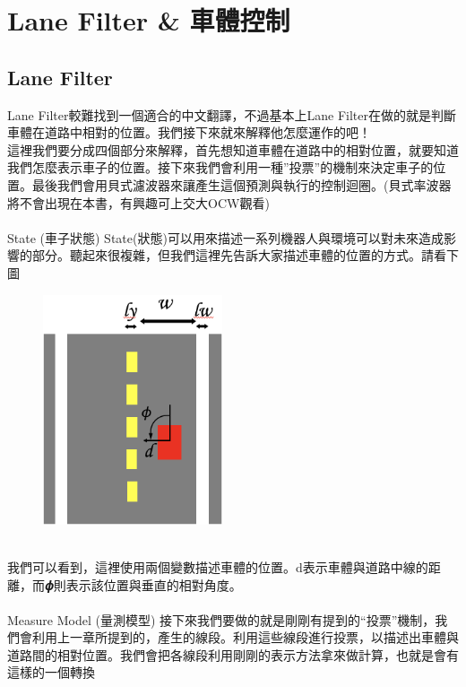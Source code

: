 \documentclass{article}
\begin{document}
\newpage
\section{Lane Filter \& 車體控制}
\subsection{Lane Filter}
Lane Filter較難找到一個適合的中文翻譯，不過基本上Lane Filter在做的就是判斷車體在道路中相對的位置。我們接下來就來解釋他怎麼運作的吧！
\\這裡我們要分成四個部分來解釋，首先想知道車體在道路中的相對位置，就要知道我們怎麼表示車子的位置。接下來我們會利用一種”投票”的機制來決定車子的位置。最後我們會用貝式濾波器來讓產生這個預測與執行的控制迴圈。(貝式率波器將不會出現在本書，有興趣可上交大OCW觀看)
\\\\State (車子狀態)
State(狀態)可以用來描述一系列機器人與環境可以對未來造成影響的部分。聽起來很複雜，但我們這裡先告訴大家描述車體的位置的方式。請看下圖
\begin{figure}[htp]
    \begin{center}
        \includegraphics[width=150pt]{pic/3_3_1.png}
    \end{center}
\end{figure}
\\
我們可以看到，這裡使用兩個變數描述車體的位置。d表示車體與道路中線的距離，而𝝓則表示該位置與垂直的相對角度。
\\\\Measure Model (量測模型)
接下來我們要做的就是剛剛有提到的“投票”機制，我們會利用上一章所提到的，產生的線段。利用這些線段進行投票，以描述出車體與道路間的相對位置。我們會把各線段利用剛剛的表示方法拿來做計算，也就是會有這樣的一個轉換
\end{document}
